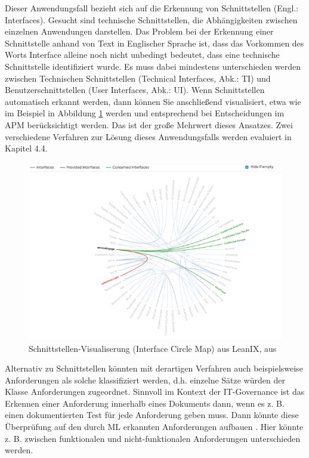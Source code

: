 Dieser Anwendungsfall bezieht sich auf die Erkennung von Schnittstellen (Engl.: Interfaces). Gesucht sind technische Schnittstellen, die Abhängigkeiten zwischen einzelnen Anwendungen darstellen. Das Problem bei der Erkennung einer Schnittstelle anhand von Text in Englischer Sprache ist, dass das Vorkommen des Worts Interface alleine noch nicht unbedingt bedeutet, dass eine technische Schnittstelle identifiziert wurde. Es muss dabei mindestens unterschieden werden zwischen Technischen Schnittstellen (Technical Interfaces, Abk.: TI) und Benutzerschnittstellen (User Interfaces, Abk.: UI). Wenn Schnittstellen automatisch erkannt werden, dann können Sie anschließend visualisiert, etwa wie im Beispiel in Abbildung \ref{Abbildung:Interface_Circle} werden und entsprechend bei Entscheidungen im APM berücksichtigt werden. Das ist der große Mehrwert dieses Ansatzes. Zwei verschiedene Verfahren zur Lösung dieses Anwendungsfalls werden evaluiert in Kapitel 4.4.

\begin{figure}[h]
\centering
\includegraphics[scale=1.0]{content/pics/Picture_10.png}
\caption{ Schnittstellen-Visualiserung (Interface Circle Map) aus LeanIX, aus \cite{leanix2} }
\label{Abbildung:Interface_Circle}
\end{figure}

Alternativ zu Schnittstellen könnten mit derartigen Verfahren auch beispielsweise Anforderungen als solche klassifiziert werden, d.h. einzelne Sätze würden der Klasse Anforderungen zugeordnet. Sinnvoll im Kontext der IT-Governance ist das Erkennen einer Anforderung innerhalb eines Dokuments dann, wenn es z. B. einen dokumentierten Test für jede Anforderung geben muss. Dann könnte diese Überprüfung auf den durch ML erkannten Anforderungen aufbauen \cite{Vogelsang}. Hier könnte z. B. zwischen funktionalen und nicht-funktionalen Anforderungen unterschieden werden.

